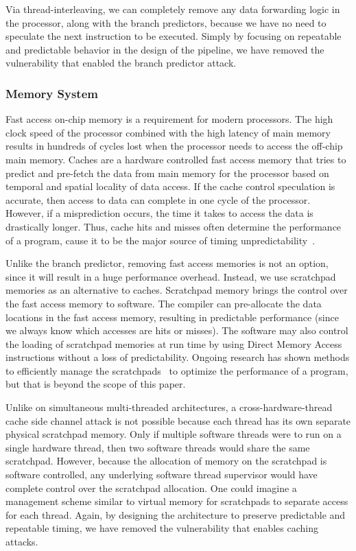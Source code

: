 \documentclass[times, 10pt,twocolumn]{article}
\begin{document}
Via thread-interleaving, we can completely remove any data forwarding logic in the processor, along with the branch predictors, because we have no need to speculate the next instruction to be executed. Simply by focusing on repeatable and predictable behavior in the design of the pipeline, we have removed the vulnerability that enabled the branch predictor attack. 

\subsubsection {Memory System}
Fast access on-chip memory is a requirement for modern processors. The high clock speed of the processor combined with the high latency of main memory results in hundreds of cycles lost when the processor needs to access the off-chip main memory. Caches are a hardware controlled fast access memory that tries to predict and pre-fetch the data from main memory for the processor based on temporal and spatial locality of data access. If the cache control speculation is accurate, then access to data can complete in one cycle of the processor. However, if a misprediction occurs, the time it takes to access the data is drastically longer. Thus, cache hits and misses often determine the performance of a program, cause it to be the major source of timing unpredictability~\cite{thiele:04:predictable}.

Unlike the branch predictor, removing fast access memories is not an option, since it will result in a huge performance overhead. Instead, we use scratchpad memories as an alternative to caches. Scratchpad memory brings the control over the fast access memory to software. The compiler can pre-allocate the data locations in the fast access memory, resulting in predictable performance (since we always know which accesses are hits or misses). The software may also control the loading of scratchpad memories at run time by using Direct Memory Access instructions without a loss of predictability. Ongoing research has shown methods to efficiently manage the scratchpads~\cite{avissar2002oma, Bandyopadhyay:EECS-2006-105, Patel:EECS-2008-115} to optimize the performance of a program, but that is  beyond the scope of this paper. 

Unlike on simultaneous multi-threaded architectures, a cross-hardware-thread cache side channel attack is not possible because each thread has its own separate physical scratchpad memory. Only if multiple software threads were to run on a single hardware thread, then two software threads would share the same scratchpad. However, because the allocation of memory on the scratchpad is software controlled, any underlying software thread supervisor would have complete control over the scratchpad allocation. One could imagine a management scheme similar to virtual memory for scratchpads to separate access for each thread. Again, by designing the architecture to preserve predictable and repeatable timing, we have removed the vulnerability that enables caching attacks.
\end{document}
